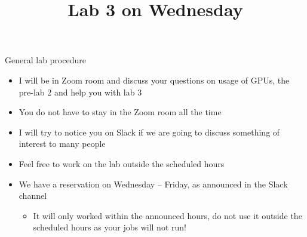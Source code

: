 

\title{Lab 3 on Wednesday}



\begin{frame}{General lab procedure}

  \begin{itemize}
  \item I will be in Zoom room and discuss your questions on usage of GPUs, the pre-lab 2 and help you with lab 3
  \item You do not have to stay in the Zoom room all the time
  \item I will try to notice you on Slack if we are going to discuss something
    of interest to many people
  \item Feel free to work on the lab outside the scheduled hours
  \item We have a reservation on Wednesday -- Friday, as announced in the
    Slack channel
    \begin{itemize}
    \item It will only worked within the announced hours, do not use
      it outside the scheduled hours as your jobs will not run!
    \end{itemize}
  \end{itemize}

\end{frame}

